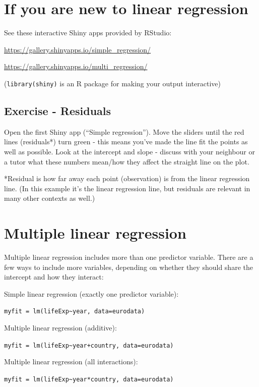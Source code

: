 \documentclass[]{book}
\begin{document}
\section{If you are new to linear
regression}\label{if-you-are-new-to-linear-regression}

See these interactive Shiny apps provided by RStudio:

\url{https://gallery.shinyapps.io/simple_regression/}

\url{https://gallery.shinyapps.io/multi_regression/}

(\texttt{library(shiny)} is an R package for making your output
interactive)

\subsection{Exercise - Residuals}\label{exercise---residuals}

Open the first Shiny app (``Simple regression''). Move the sliders until
the red lines (residuals*) turn green - this means you've made the line
fit the points as well as possible. Look at the intercept and slope -
discuss with your neighbour or a tutor what these numbers mean/how they
affect the straight line on the plot.

*Residual is how far away each point (observation) is from the linear
regression line. (In this example it's the linear regression line, but
residuals are relevant in many other contexts as well.)

\section{Multiple linear regression}\label{multiple-linear-regression}

Multiple linear regression includes more than one predictor variable.
There are a few ways to include more variables, depending on whether
they should share the intercept and how they interact:

Simple linear regression (exactly one predictor variable):

\texttt{myfit\ =\ lm(lifeExp\textasciitilde{}year,\ data=eurodata)}

Multiple linear regression (additive):

\texttt{myfit\ =\ lm(lifeExp\textasciitilde{}year+country,\ data=eurodata)}

Multiple linear regression (all interactions):

\texttt{myfit\ =\ lm(lifeExp\textasciitilde{}year*country,\ data=eurodata)}
\end{document}
